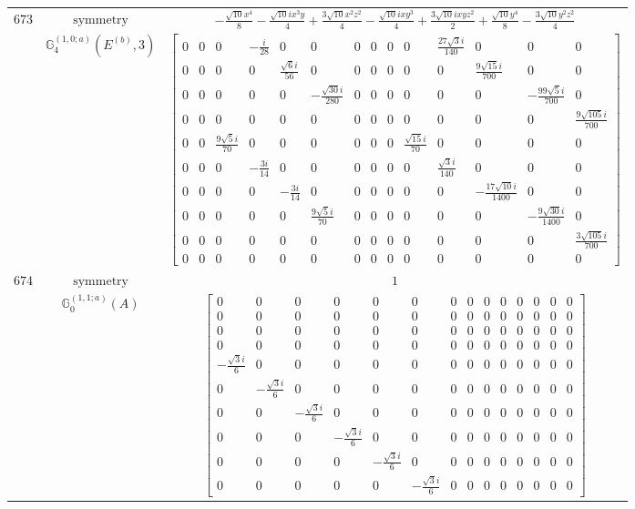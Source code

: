 \documentclass[fleqn,8pt,landscape]{jsarticle}
\begin{document}
\begin{longtable}{ccc}
$ 673 $ & $ \text{symmetry} $ & $ - \frac{\sqrt{10} x^{4}}{8} - \frac{\sqrt{10} i x^{3} y}{4} + \frac{3 \sqrt{10} x^{2} z^{2}}{4} - \frac{\sqrt{10} i x y^{3}}{4} + \frac{3 \sqrt{10} i x y z^{2}}{2} + \frac{\sqrt{10} y^{4}}{8} - \frac{3 \sqrt{10} y^{2} z^{2}}{4} $ \\
$  $ & $ \mathbb{G}_{4}^{(1,0;a)}(E^{(b)},3) $ & $ \begin{bmatrix} 0 & 0 & 0 & - \frac{i}{28} & 0 & 0 & 0 & 0 & 0 & 0 & \frac{27 \sqrt{3} i}{140} & 0 & 0 & 0 \\ 0 & 0 & 0 & 0 & \frac{\sqrt{6} i}{56} & 0 & 0 & 0 & 0 & 0 & 0 & \frac{9 \sqrt{15} i}{700} & 0 & 0 \\ 0 & 0 & 0 & 0 & 0 & - \frac{\sqrt{30} i}{280} & 0 & 0 & 0 & 0 & 0 & 0 & - \frac{99 \sqrt{5} i}{700} & 0 \\ 0 & 0 & 0 & 0 & 0 & 0 & 0 & 0 & 0 & 0 & 0 & 0 & 0 & \frac{9 \sqrt{105} i}{700} \\ 0 & 0 & \frac{9 \sqrt{5} i}{70} & 0 & 0 & 0 & 0 & 0 & 0 & \frac{\sqrt{15} i}{70} & 0 & 0 & 0 & 0 \\ 0 & 0 & 0 & - \frac{3 i}{14} & 0 & 0 & 0 & 0 & 0 & 0 & \frac{\sqrt{3} i}{140} & 0 & 0 & 0 \\ 0 & 0 & 0 & 0 & - \frac{3 i}{14} & 0 & 0 & 0 & 0 & 0 & 0 & - \frac{17 \sqrt{10} i}{1400} & 0 & 0 \\ 0 & 0 & 0 & 0 & 0 & \frac{9 \sqrt{5} i}{70} & 0 & 0 & 0 & 0 & 0 & 0 & - \frac{9 \sqrt{30} i}{1400} & 0 \\ 0 & 0 & 0 & 0 & 0 & 0 & 0 & 0 & 0 & 0 & 0 & 0 & 0 & \frac{3 \sqrt{105} i}{700} \\ 0 & 0 & 0 & 0 & 0 & 0 & 0 & 0 & 0 & 0 & 0 & 0 & 0 & 0 \end{bmatrix} $ \\ \hline
$ 674 $ & $ \text{symmetry} $ & $ 1 $ \\
$  $ & $ \mathbb{G}_{0}^{(1,1;a)}(A) $ & $ \begin{bmatrix} 0 & 0 & 0 & 0 & 0 & 0 & 0 & 0 & 0 & 0 & 0 & 0 & 0 & 0 \\ 0 & 0 & 0 & 0 & 0 & 0 & 0 & 0 & 0 & 0 & 0 & 0 & 0 & 0 \\ 0 & 0 & 0 & 0 & 0 & 0 & 0 & 0 & 0 & 0 & 0 & 0 & 0 & 0 \\ 0 & 0 & 0 & 0 & 0 & 0 & 0 & 0 & 0 & 0 & 0 & 0 & 0 & 0 \\ - \frac{\sqrt{3} i}{6} & 0 & 0 & 0 & 0 & 0 & 0 & 0 & 0 & 0 & 0 & 0 & 0 & 0 \\ 0 & - \frac{\sqrt{3} i}{6} & 0 & 0 & 0 & 0 & 0 & 0 & 0 & 0 & 0 & 0 & 0 & 0 \\ 0 & 0 & - \frac{\sqrt{3} i}{6} & 0 & 0 & 0 & 0 & 0 & 0 & 0 & 0 & 0 & 0 & 0 \\ 0 & 0 & 0 & - \frac{\sqrt{3} i}{6} & 0 & 0 & 0 & 0 & 0 & 0 & 0 & 0 & 0 & 0 \\ 0 & 0 & 0 & 0 & - \frac{\sqrt{3} i}{6} & 0 & 0 & 0 & 0 & 0 & 0 & 0 & 0 & 0 \\ 0 & 0 & 0 & 0 & 0 & - \frac{\sqrt{3} i}{6} & 0 & 0 & 0 & 0 & 0 & 0 & 0 & 0 \end{bmatrix} $ \\ \hline

\end{longtable}
\end{document}
